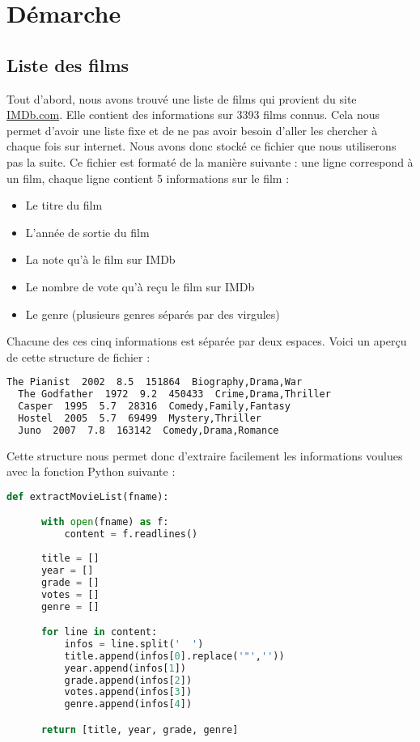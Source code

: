 \chapter{Démarche}
\section{Liste des films}

Tout d'abord, nous avons trouvé une liste de films qui provient du site \url{IMDb.com}. Elle contient des informations sur 3393 films connus. Cela nous permet d'avoir une liste fixe et de ne pas avoir besoin d'aller les chercher à chaque fois sur internet. Nous avons donc stocké ce fichier que nous utiliserons pas la suite. Ce fichier est formaté de la manière suivante : une ligne correspond à un film, chaque ligne contient 5 informations sur le film :

\begin{itemize}
 \item Le titre du film
 \item L'année de sortie du film
 \item La note qu'à le film sur IMDb
 \item Le nombre de vote qu'à reçu le film sur IMDb
 \item Le genre (plusieurs genres séparés par des virgules)
\end{itemize}

Chacune des ces cinq informations est séparée par deux espaces. Voici un aperçu de cette structure de fichier : \\

\begin{lstlisting}[language=bash]
  The Pianist﻿  2002﻿  8.5﻿  151864﻿  Biography,Drama,War
  The Godfather﻿  1972﻿  9.2﻿  450433﻿  Crime,Drama,Thriller
  Casper﻿  1995﻿  5.7﻿  28316﻿  Comedy,Family,Fantasy
  Hostel﻿  2005﻿  5.7﻿  69499﻿  Mystery,Thriller
  Juno﻿  2007﻿  7.8﻿  163142﻿  Comedy,Drama,Romance
\end{lstlisting}

Cette structure nous permet donc d'extraire facilement les informations voulues avec la fonction Python suivante : \\

\begin{lstlisting}[language=python]
  def extractMovieList(fname):

      with open(fname) as f:
          content = f.readlines()
    
      title = []
      year = []
      grade = []
      votes = []
      genre = []

      for line in content:
          infos = line.split('  ')
          title.append(infos[0].replace('"',''))
          year.append(infos[1])
          grade.append(infos[2])
          votes.append(infos[3])
          genre.append(infos[4])

      return [title, year, grade, genre]
\end{lstlisting}

